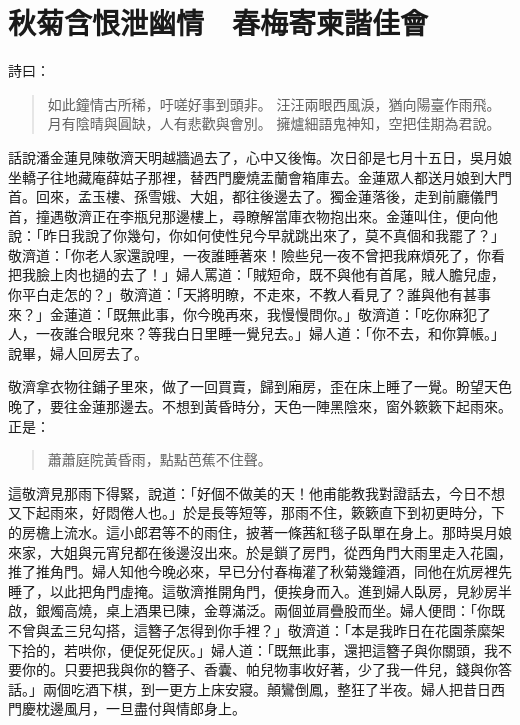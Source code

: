 
\chapter{秋菊含恨泄幽情　春梅寄柬諧佳會}

詩曰：
\begin{quote}
如此鐘情古所稀，吁嗟好事到頭非。
汪汪兩眼西風淚，猶向陽臺作雨飛。
月有陰晴與圓缺，人有悲歡與會別。
擁爐細語鬼神知，空把佳期為君說。
\end{quote}

話說潘金蓮見陳敬濟天明越牆過去了，心中又後悔。次日卻是七月十五日，吳月娘坐轎子往地藏庵薛姑子那裡，替西門慶燒盂蘭會箱庫去。金蓮眾人都送月娘到大門首。回來，孟玉樓、孫雪娥、大姐，都往後邊去了。獨金蓮落後，走到前廳儀門首，撞遇敬濟正在李瓶兒那邊樓上，尋瞭解當庫衣物抱出來。金蓮叫住，便向他說：「昨日我說了你幾句，你如何使性兒今早就跳出來了，莫不真個和我罷了？」敬濟道：「你老人家還說哩，一夜誰睡著來！險些兒一夜不曾把我麻煩死了，你看把我臉上肉也撾的去了！」婦人罵道：「賊短命，既不與他有首尾，賊人膽兒虛，你平白走怎的？」敬濟道：「天將明瞭，不走來，不教人看見了？誰與他有甚事來？」金蓮道：「既無此事，你今晚再來，我慢慢問你。」敬濟道：「吃你麻犯了人，一夜誰合眼兒來？等我白日里睡一覺兒去。」婦人道：「你不去，和你算帳。」說畢，婦人回房去了。

敬濟拿衣物往鋪子里來，做了一回買賣，歸到廂房，歪在床上睡了一覺。盼望天色晚了，要往金蓮那邊去。不想到黃昏時分，天色一陣黑陰來，窗外簌簌下起雨來。正是：
\begin{quote}
蕭蕭庭院黃昏雨，點點芭蕉不住聲。
\end{quote}

這敬濟見那雨下得緊，說道：「好個不做美的天！他甫能教我對證話去，今日不想又下起雨來，好悶倦人也。」於是長等短等，那雨不住，簌簌直下到初更時分，下的房檐上流水。這小郎君等不的雨住，披著一條茜紅毯子臥單在身上。那時吳月娘來家，大姐與元宵兒都在後邊沒出來。於是鎖了房門，從西角門大雨里走入花園，推了推角門。婦人知他今晚必來，早已分付春梅灌了秋菊幾鐘酒，同他在炕房裡先睡了，以此把角門虛掩。這敬濟推開角門，便挨身而入。進到婦人臥房，見紗房半啟，銀燭高燒，桌上酒果已陳，金尊滿泛。兩個並肩疊股而坐。婦人便問：「你既不曾與孟三兒勾搭，這簪子怎得到你手裡？」敬濟道：「本是我昨日在花園荼縻架下拾的，若哄你，便促死促灰。」婦人道：「既無此事，還把這簪子與你關頭，我不要你的。只要把我與你的簪子、香囊、帕兒物事收好著，少了我一件兒，錢與你答話。」兩個吃酒下棋，到一更方上床安寢。顛鸞倒鳳，整狂了半夜。婦人把昔日西門慶枕邊風月，一旦盡付與情郎身上。

